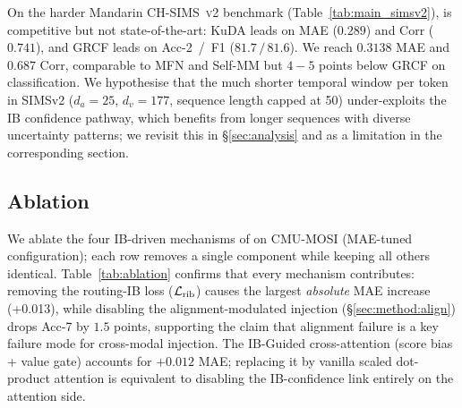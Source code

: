 On the harder Mandarin \textsc{CH-SIMS~v2} benchmark
(Table~\ref{tab:main_simsv2}), \methodname{} is competitive but not
state-of-the-art: KuDA leads on MAE ($0.289$) and Corr ($0.741$), and
GRCF leads on Acc-2~/~F1 ($81.7\,/\,81.6$).
We reach $0.3138$ MAE and $0.687$ Corr, comparable to MFN and
Self-MM but $4{-}5$ points below GRCF on classification.
We hypothesise that the much shorter temporal window per token in
SIMSv2 ($d_{a}=25$, $d_{v}=177$, sequence length capped at 50)
under-exploits the IB confidence pathway, which benefits from longer
sequences with diverse uncertainty patterns; we revisit this in
\S\ref{sec:analysis} and as a limitation in the corresponding section.





\subsection{Ablation}
\label{sec:exp:ablation}

We ablate the four IB-driven mechanisms of \methodname{} on
\textsc{CMU-MOSI} (MAE-tuned configuration); each row removes a single
component while keeping all others identical.
Table~\ref{tab:ablation} confirms that every mechanism contributes:
removing the routing-IB loss ($\mathcal{L}_{\text{rib}}$) causes the largest
\emph{absolute} MAE increase (+0.013), while disabling the
alignment-modulated injection (\S\ref{sec:method:align}) drops Acc-7 by
$1.5$ points, supporting the claim that alignment failure is a key
failure mode for cross-modal injection.
The IB-Guided cross-attention (score bias + value gate) accounts for
$+0.012$ MAE; replacing it by vanilla scaled dot-product attention is
equivalent to disabling the IB-confidence link entirely on the
attention side.


